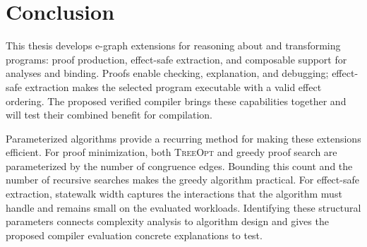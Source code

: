 \section{Conclusion}
\label{sec:conclusion}

This thesis develops e-graph extensions for reasoning about and transforming programs:
  proof production, effect-safe extraction, and composable support for analyses and binding.
Proofs enable checking, explanation, and debugging;
  effect-safe extraction makes the selected program executable with a valid effect ordering.
The proposed verified compiler brings these capabilities together
  and will test their combined benefit for compilation.

Parameterized algorithms provide a recurring method for making these extensions efficient.
For proof minimization, both \textsc{TreeOpt} and greedy proof search are parameterized
  by the number of congruence edges.
Bounding this count and the number of recursive searches makes the greedy algorithm practical.
For effect-safe extraction, statewalk width captures the interactions
  that the algorithm must handle and remains small on the evaluated workloads.
Identifying these structural parameters connects complexity analysis to algorithm design
  and gives the proposed compiler evaluation concrete explanations to test.

